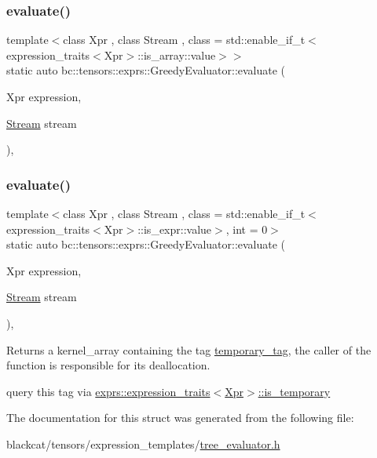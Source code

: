 \subsubsection{\texorpdfstring{evaluate()}{evaluate()}\hspace{0.1cm}{\footnotesize\ttfamily [1/2]}}
{\footnotesize\ttfamily template$<$class Xpr , class Stream , class  = std\+::enable\+\_\+if\+\_\+t$<$expression\+\_\+traits$<$\+Xpr$>$\+::is\+\_\+array\+::value$>$$>$ \\
static auto bc\+::tensors\+::exprs\+::\+Greedy\+Evaluator\+::evaluate (\begin{DoxyParamCaption}\item[{Xpr}]{expression,  }\item[{\hyperlink{classbc_1_1streams_1_1Stream}{Stream}}]{stream }\end{DoxyParamCaption})\hspace{0.3cm}{\ttfamily [inline]}, {\ttfamily [static]}}

\mbox{\label{structbc_1_1tensors_1_1exprs_1_1GreedyEvaluator_aac54457c2b42be3206a7c666e2acad51}} 
\subsubsection{\texorpdfstring{evaluate()}{evaluate()}\hspace{0.1cm}{\footnotesize\ttfamily [2/2]}}
{\footnotesize\ttfamily template$<$class Xpr , class Stream , class  = std\+::enable\+\_\+if\+\_\+t$<$expression\+\_\+traits$<$\+Xpr$>$\+::is\+\_\+expr\+::value$>$, int  = 0$>$ \\
static auto bc\+::tensors\+::exprs\+::\+Greedy\+Evaluator\+::evaluate (\begin{DoxyParamCaption}\item[{Xpr}]{expression,  }\item[{\hyperlink{classbc_1_1streams_1_1Stream}{Stream}}]{stream }\end{DoxyParamCaption})\hspace{0.3cm}{\ttfamily [inline]}, {\ttfamily [static]}}



Returns a kernel\+\_\+array containing the tag \hyperlink{structbc_1_1tensors_1_1exprs_1_1temporary__tag}{temporary\+\_\+tag}, the caller of the function is responsible for its deallocation. 

query this tag via \textquotesingle{}\hyperlink{structbc_1_1tensors_1_1exprs_1_1expression__traits_ab5b69e55697b1e78cf9272ac1e9214a0}{exprs\+::expression\+\_\+traits$<$\+Xpr$>$\+::is\+\_\+temporary}\textquotesingle{} 

The documentation for this struct was generated from the following file\+:\begin{DoxyCompactItemize}
\item 
blackcat/tensors/expression\+\_\+templates/\hyperlink{tree__evaluator_8h}{tree\+\_\+evaluator.\+h}\end{DoxyCompactItemize}
